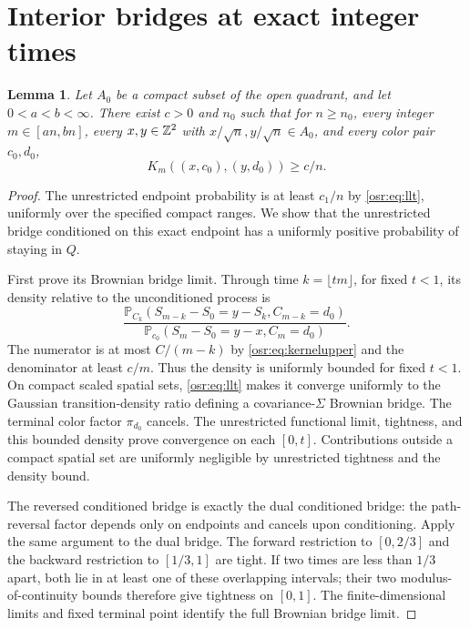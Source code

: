 \documentclass[11pt,letterpaper]{article}
\newtheorem{lemma}[theorem]{Lemma}
\newcommand{\Prob}{\mathbb P}\newcommand{\E}{\mathbb E}
\numberwithin{equation}{section}
\begin{document}
\section{Interior bridges at exact integer times}\label{osr:sec:bridge}
\begin{lemma}\label{osr:lem:bridge}
Let $A_0$ be a compact subset of the open quadrant, and let $0<a<b<\infty$. There exist $c>0$ and $n_0$ such that for $n\ge n_0$, every integer $m\in[an,bn]$, every $x,y\in\mathbb Z^2$ with $x/\sqrt n,y/\sqrt n\in A_0$, and every color pair $c_0,d_0$,
\begin{equation}\label{osr:eq:bridge}
 K_m((x,c_0),(y,d_0))\ge c/n.
\end{equation}
\end{lemma}
\begin{proof}
The unrestricted endpoint probability is at least $c_1/n$ by \eqref{osr:eq:llt}, uniformly over the specified compact ranges. We show that the unrestricted bridge conditioned on this exact endpoint has a uniformly positive probability of staying in $Q$.

First prove its Brownian bridge limit. Through time $k=\lfloor tm\rfloor$, for fixed $t<1$, its density relative to the unconditioned process is
\begin{equation}\label{osr:eq:bridgeratio}
 \frac{\Prob_{C_k}(S_{m-k}-S_0=y-S_k,C_{m-k}=d_0)}
 {\Prob_{c_0}(S_m-S_0=y-x,C_m=d_0)}.
\end{equation}
The numerator is at most $C/(m-k)$ by \eqref{osr:eq:kernelupper} and the denominator at least $c/m$. Thus the density is uniformly bounded for fixed $t<1$. On compact scaled spatial sets, \eqref{osr:eq:llt} makes it converge uniformly to the Gaussian transition-density ratio defining a covariance-$\Sigma$ Brownian bridge. The terminal color factor $\pi_{d_0}$ cancels. The unrestricted functional limit, tightness, and this bounded density prove convergence on each $[0,t]$. Contributions outside a compact spatial set are uniformly negligible by unrestricted tightness and the density bound.

The reversed conditioned bridge is exactly the dual conditioned bridge: the path-reversal factor depends only on endpoints and cancels upon conditioning. Apply the same argument to the dual bridge. The forward restriction to $[0,2/3]$ and the backward restriction to $[1/3,1]$ are tight. If two times are less than $1/3$ apart, both lie in at least one of these overlapping intervals; their two modulus-of-continuity bounds therefore give tightness on $[0,1]$. The finite-dimensional limits and fixed terminal point identify the full Brownian bridge limit.


\end{proof}
\end{document}
